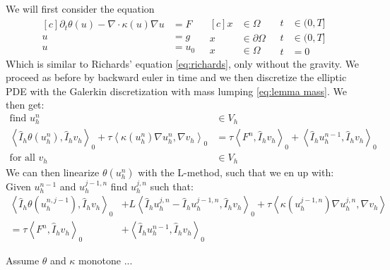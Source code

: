 \documentclass[../Main/main.tex]{subfiles}
\begin{document}
	
	We will first consider the equation
	\begin{equation}\label{eq:richards simple}
		\begin{aligned}[c]
			\partial_t \theta(u) - \nabla \cdot \kappa (u) \nabla u &= F \\
			u &= g \\
			u &= u_0
		\end{aligned}
		\ \ \
		\begin{aligned}[c]
			x &\in \Omega  \\
			x &\in \partial \Omega \\
			x &\in \Omega  
		\end{aligned}
		\ \ \
		\begin{aligned}
			t&\in (0,T] \\
			t&\in (0,T] \\
			t&=0
		\end{aligned}
	\end{equation}
	Which is similar to Richards' equation \eqref{eq:richards}, only without the gravity. We proceed as before by backward euler in time and we then discretize the elliptic PDE with the Galerkin discretization with mass lumping \eqref{eq:lemma mass}. We then get:
	\begin{equation}
		\begin{aligned}
			\text{find }u_h^n&\in V_h\\
			\left \langle \hat{I}_h \theta(u_h^n),\hat{I}_h v_h \right \rangle_0 +\tau \left \langle \kappa(u_h^n) \nabla u^n_h, \nabla v_h \right \rangle_0 &= \tau \left \langle F^n,\hat{I}_h v_h \right \rangle_0 + \left \langle \hat{I}_h u_h^{n-1},\hat{I}_h v_h \right \rangle_0 \\
			\text{for all }v_h &\in V_h
		\end{aligned}
	\end{equation}
	We can then linearize $\theta(u^n_h)$ with the L-method, such that we en up with: Given $u^{n-1}_h$ and $u^{j-1,n}_h$ find $u^{j,n}_h$ such that:
	\begin{equation}
		\begin{aligned}
			\left \langle \hat{I}_h \theta(u^{n,j-1}_h),\hat{I}_h v_h \right \rangle_0 &+ L \left \langle \hat{I}_h u^{j,n}_h -  \hat{I}_h u^{j-1,n}_h,\hat{I}_h v_h \right \rangle_0 + \tau \left \langle \kappa(u_h^{j-1,n})\nabla u^{j,n}_h,\nabla v_h \right \rangle \\=\tau \left \langle F^n,\hat{I}_h v_h \right \rangle_0 &+ \left \langle \hat{I}_h u_h^{n-1},\hat{I}_h v_h \right \rangle_0 
		\end{aligned}
	\end{equation}
	\begin{theorem}
		Assume $\theta$ and $\kappa$ monotone ...
	\end{theorem}
\end{document}
